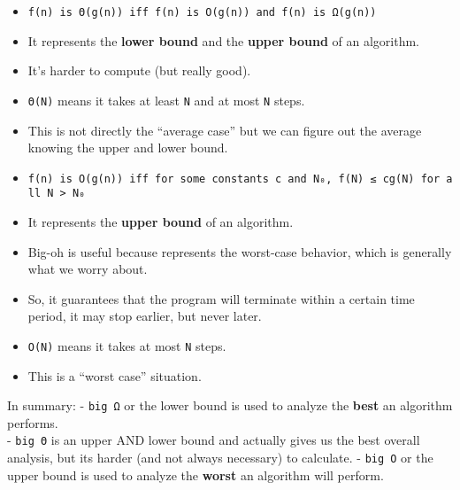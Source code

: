\hypertarget{big-theta-ux3b8}{%
	\label{big-theta-ux3b8}}

\begin{itemize}
	\tightlist
	\item
	      \texttt{f(n)\ is\ Θ(g(n))\ iff\ f(n)\ is\ O(g(n))\ and\ f(n)\ is\ Ω(g(n))}
	\item
	      It represents the \textbf{lower bound} and the \textbf{upper bound} of
	      an algorithm.
	\item
	      It's harder to compute (but really good).
	\item
	      \texttt{Θ(N)} means it takes at least \texttt{N} and at most
	      \texttt{N} steps.
	\item
	      This is not directly the ``average case'' but we can figure out the
	      average knowing the upper and lower bound.
\end{itemize}

\hypertarget{big-oh-o}{%
	\label{big-oh-o}}

\begin{itemize}
	\tightlist
	\item
	      \texttt{f(n)\ is\ O(g(n))\ iff\ for\ some\ constants\ c\ and\ N₀,\ f(N)\ ≤\ cg(N)\ for\ all\ N\ \textgreater{}\ N₀}
	\item
	      It represents the \textbf{upper bound} of an algorithm.
	\item
	      Big-oh is useful because represents the worst-case behavior, which is
	      generally what we worry about.
	\item
	      So, it guarantees that the program will terminate within a certain
	      time period, it may stop earlier, but never later.
	\item
	      \texttt{O(N)} means it takes at most \texttt{N} steps.
	\item
	      This is a ``worst case'' situation.
\end{itemize}

In summary: - \texttt{big\ Ω} or the lower bound is used to analyze the \textbf{best} an algorithm performs.\\
- \texttt{big\ Θ} is an upper AND lower bound and actually gives us the
best overall analysis, but its harder (and not always necessary) to
calculate. - \texttt{big\ O} or the upper bound is used to analyze the
\textbf{worst} an algorithm will perform.

\hypertarget{run-time-calculations}{%
	\label{run-time-calculations}}

